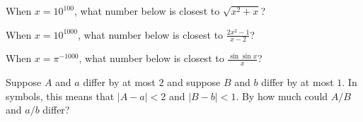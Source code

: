 \documentclass{ximera}
\begin{document}


\begin{problem}
  When $x = 10^{100}$, what number below is closest to $\sqrt{x^2 + x}$?
  \begin{multipleChoice}
  \end{multipleChoice}
\end{problem}

\begin{problem}
  When $x = 10^{1000}$, what number below is closest to $\frac{2x^2 - 1}{x-2}$? %
  \begin{multipleChoice}
  \end{multipleChoice}
\end{problem}

\begin{problem}
  When $x = \pi^{-1000}$, what number below is closest to $\frac{\sin \sin x}{x}$?
  \begin{multipleChoice}
  \end{multipleChoice}
\end{problem}

\begin{problem}
  Suppose $A$ and $a$ differ by at most $2$ and suppose $B$ and $b$
  differ by at most $1$.  In symbols, this means that $|A - a| < 2$ and $|B - b| < 1$.
  By how much could $A/B$ and $a/b$ differ?
  \begin{multipleChoice}
  \end{multipleChoice}
\end{problem}
\end{document}
